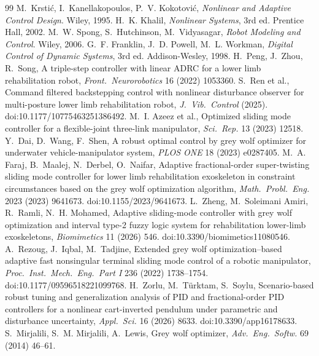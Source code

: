 \documentclass[10pt,journal,compsoc]{IEEEtran}
\begin{document}
\begingroup\footnotesize\setlength{\itemsep}{0pt}\setlength{\parsep}{0pt}
\begin{thebibliography}{99}
 M.~Krsti\'c, I.~Kanellakopoulos, P.~V. Kokotovi\'c, \emph{Nonlinear and Adaptive Control Design}. Wiley, 1995.
 H.~K. Khalil, \emph{Nonlinear Systems}, 3rd ed. Prentice Hall, 2002.
 M.~W. Spong, S.~Hutchinson, M.~Vidyasagar, \emph{Robot Modeling and Control}. Wiley, 2006.
 G.~F. Franklin, J.~D. Powell, M.~L. Workman, \emph{Digital Control of Dynamic Systems}, 3rd ed. Addison-Wesley, 1998.
 H.~Peng, J.~Zhou, R.~Song, A triple-step controller with linear ADRC for a lower limb rehabilitation robot, \emph{Front.\ Neurorobotics} 16 (2022) 1053360.
 S.~Ren et al., Command filtered backstepping control with nonlinear disturbance observer for multi-posture lower limb rehabilitation robot, \emph{J.\ Vib.\ Control} (2025). doi:10.1177/10775463251386492.
 M.~I. Azeez et al., Optimized sliding mode controller for a flexible-joint three-link manipulator, \emph{Sci.\ Rep.} 13 (2023) 12518.
 Y.~Dai, D.~Wang, F.~Shen, A robust optimal control by grey wolf optimizer for underwater vehicle-manipulator system, \emph{PLOS ONE} 18 (2023) e0287405.
 M.~A. Faraj, B.~Maalej, N.~Derbel, O.~Naifar, Adaptive fractional-order super-twisting sliding mode controller for lower limb rehabilitation exoskeleton in constraint circumstances based on the grey wolf optimization algorithm, \emph{Math.\ Probl.\ Eng.} 2023 (2023) 9641673. doi:10.1155/2023/9641673.
 L.~Zheng, M.~Soleimani Amiri, R.~Ramli, N.~H. Mohamed, Adaptive sliding-mode controller with grey wolf optimization and interval type-2 fuzzy logic system for rehabilitation lower-limb exoskeletons, \emph{Biomimetics} 11 (2026) 546. doi:10.3390/biomimetics11080546.
 A.~Rezoug, J.~Iqbal, M.~Tadjine, Extended grey wolf optimization--based adaptive fast nonsingular terminal sliding mode control of a robotic manipulator, \emph{Proc.\ Inst.\ Mech.\ Eng.\ Part I} 236 (2022) 1738--1754. doi:10.1177/09596518221099768.
 H.~Zorlu, M.~T\"urktam, S.~Soylu, Scenario-based robust tuning and generalization analysis of PID and fractional-order PID controllers for a nonlinear cart-inverted pendulum under parametric and disturbance uncertainty, \emph{Appl.\ Sci.} 16 (2026) 8633. doi:10.3390/app16178633.
 S.~Mirjalili, S.~M. Mirjalili, A.~Lewis, Grey wolf optimizer, \emph{Adv.\ Eng.\ Softw.} 69 (2014) 46--61.

\end{thebibliography}
\end{document}
